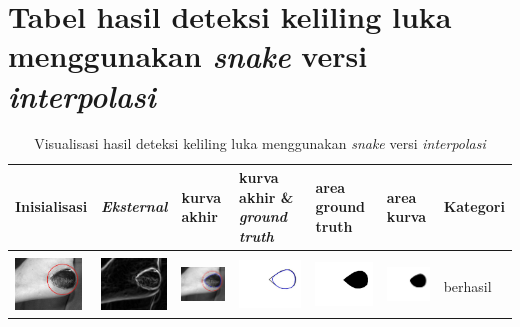 \chapter{Tabel hasil deteksi keliling luka menggunakan \emph{snake} versi \emph{interpolasi}}
\begin{table}[H]
	\centering
	\caption{Visualisasi hasil deteksi keliling luka menggunakan \emph{snake} versi \emph{interpolasi}}
	\label{tabel_hasil_1_interp}
	\begin{tabular}{|m{0.7in}|m{0.7in}|m{0.7in}|m{0.7in}|m{0.7in}|m{0.7in}|m{0.7in}|}
		\hline
		\textbf{Inisialisasi} & \textbf{\emph{Eksternal}} & \textbf{kurva akhir} & \textbf{kurva akhir \& \emph{ground truth}}& \textbf{area ground truth} & \textbf{area kurva} & \textbf{Kategori} \\
		\hline
		
		&  &  & & & &  \\
		\includegraphics[width=0.7in]{dataset/dataset_3/luka_hitam/ready/2_interp_init.jpg}&
		\includegraphics[width=0.7in]{dataset/dataset_3/luka_hitam/ready/2_interp_ext.jpg}&
		\includegraphics[width=0.7in]{dataset/dataset_3/luka_hitam/ready/2_interp_result.jpg}&
		\includegraphics[width=0.7in]{dataset/dataset_3/luka_hitam/ready/2_gt_r.jpg}&
		\includegraphics[width=0.7in]{dataset/dataset_3/luka_hitam/ready/2_r.jpg}&
		\includegraphics[width=0.7in]{dataset/dataset_3/luka_hitam/ready/2_interp_r.jpg}&
		berhasil\\
		\hline
		

\end{tabular}
\end{table}
